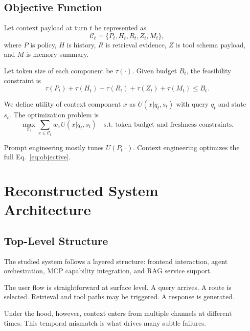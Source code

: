 \documentclass[conference]{IEEEtran}
\begin{document}
\subsection{Objective Function}

Let context payload at turn $t$ be represented as
\begin{equation}
\mathcal{C}_t = \{P_t, H_t, R_t, Z_t, M_t\},
\end{equation}
where $P$ is policy, $H$ is history, $R$ is retrieval evidence, $Z$ is tool schema payload, and $M$ is memory summary.

Let token size of each component be $\tau(\cdot)$.
Given budget $B_t$, the feasibility constraint is
\begin{equation}
\tau(P_t)+\tau(H_t)+\tau(R_t)+\tau(Z_t)+\tau(M_t) \le B_t.
\end{equation}

We define utility of context component $x$ as $U(x|q_t,s_t)$ with query $q_t$ and state $s_t$.
The optimization problem is
\begin{equation}
\max_{\mathcal{C}_t} \sum_{x\in\mathcal{C}_t} w_x U(x|q_t,s_t)
\quad \text{s.t. token budget and freshness constraints.}
\label{eq:objective}
\end{equation}

Prompt engineering mostly tunes $U(P_t|\cdot)$.
Context engineering optimizes the full Eq.~\ref{eq:objective}.

\section{Reconstructed System Architecture}
\label{sec:architecture}

\subsection{Top-Level Structure}

The studied system follows a layered structure:
frontend interaction,
agent orchestration,
MCP capability integration,
and RAG service support.

The user flow is straightforward at surface level.
A query arrives.
A route is selected.
Retrieval and tool paths may be triggered.
A response is generated.

Under the hood, however, context enters from multiple channels at different times.
This temporal mismatch is what drives many subtle failures.
\end{document}
